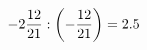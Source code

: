\documentclass[preview]{standalone}
\begin{document}
\begin{align*}
-2 { 12 \over 21 }  :  \left( - { 12 \over 21 } \right) = 2.5
\end{align*}
\end{document}
